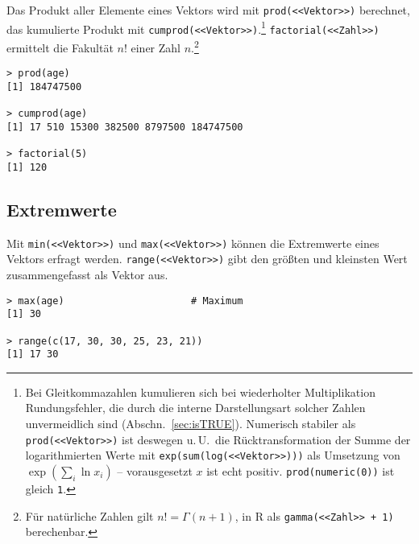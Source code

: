 Das Produkt aller Elemente eines Vektors wird mit \lstinline!prod(<<Vektor>>)! berechnet, das kumulierte Produkt mit \lstinline!cumprod(<<Vektor>>)!.\footnote{\label{ftn:cumProd}Bei Gleitkommazahlen kumulieren sich bei wiederholter Multiplikation Rundungsfehler, die durch die interne Darstellungsart solcher Zahlen unvermeidlich sind (Abschn.\ \ref{sec:isTRUE}). Numerisch stabiler als \lstinline!prod(<<Vektor>>)! ist deswegen u.\,U.\ die Rücktransformation der Summe der logarithmierten Werte mit \lstinline!exp(sum(log(<<Vektor>>)))! als Umsetzung von $\exp\left(\sum_{i}{\ln x_{i}}\right)$ -- vorausgesetzt $x$ ist echt positiv. \lstinline!prod(numeric(0))! ist gleich \lstinline!1!.} \lstinline!factorial(<<Zahl>>)! ermittelt die Fakultät $n!$ einer Zahl $n$.\footnote{Für natürliche Zahlen gilt $n! = \Gamma(n+1)$, in R als \lstinline!gamma(<<Zahl>> + 1)! berechenbar.}
\begin{lstlisting}
> prod(age)
[1] 184747500

> cumprod(age)
[1] 17 510 15300 382500 8797500 184747500

> factorial(5)
[1] 120
\end{lstlisting}

\subsection{Extremwerte}

Mit \lstinline!min(<<Vektor>>)! und \lstinline!max(<<Vektor>>)! können die Extremwerte eines Vektors erfragt werden. \lstinline!range(<<Vektor>>)! gibt den größten und kleinsten Wert zusammengefasst als Vektor aus.
\begin{lstlisting}
> max(age)                      # Maximum
[1] 30

> range(c(17, 30, 30, 25, 23, 21))
[1] 17 30
\end{lstlisting}

